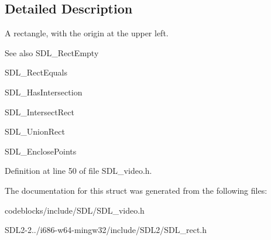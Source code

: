 \subsection{Detailed Description}
A rectangle, with the origin at the upper left. 

\begin{DoxySeeAlso}{See also}
S\+D\+L\+\_\+\+Rect\+Empty 

S\+D\+L\+\_\+\+Rect\+Equals 

S\+D\+L\+\_\+\+Has\+Intersection 

S\+D\+L\+\_\+\+Intersect\+Rect 

S\+D\+L\+\_\+\+Union\+Rect 

S\+D\+L\+\_\+\+Enclose\+Points 
\end{DoxySeeAlso}


Definition at line 50 of file S\+D\+L\+\_\+video.\+h.



The documentation for this struct was generated from the following files\+:\begin{DoxyCompactItemize}
\item 
codeblocks/include/\+S\+D\+L/S\+D\+L\+\_\+video.\+h\item 
S\+D\+L2-\/2../i686-\/w64-\/mingw32/include/\+S\+D\+L2/S\+D\+L\+\_\+rect.\+h\end{DoxyCompactItemize}
